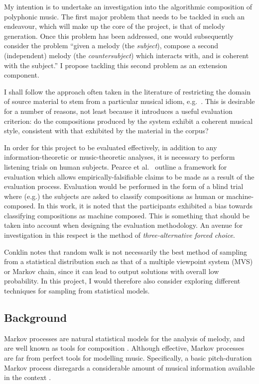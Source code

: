\documentclass[12pt,a4paper,twoside]{article}
\begin{document}
My intention is to undertake an investigation into the algorithmic composition
of polyphonic music. The first major problem that needs to be tackled in such an
endeavour, which will make up the core of the project, is that of melody
generation. Once this problem has been addressed, one would subsequently
consider the problem ``given a melody (the \emph{subject}), compose a second
(independent) melody (the \emph{countersubject}) which interacts with, and is
coherent with the subject.'' I propose tackling this second problem as an
extension component.

I shall follow the approach often taken in the literature of restricting the
domain of source material to stem from a particular musical idiom, e.g.\
\cite{pearce2001evaluation}. This is desirable for a number of reasons, not
least because it introduces a useful evaluation criterion: do the compositions
produced by the system exhibit a coherent musical style, consistent with that
exhibited by the material in the corpus?

In order for this project to be evaluated effectively, in addition to any
information-theoretic or music-theoretic analyses, it is necessary to perform
listening trials on human subjects. Pearce et al.\ \cite{pearce2001evaluation}
outline a framework for evaluation which allows empirically-falsifiable claims
to be made as a result of the evaluation process. Evaluation would be performed
in the form of a blind trial where (e.g.) the subjects are asked to classify
compositions as human or machine-composed. In this work, it is noted that the
participants exhibited a bias towards classifying compositions as machine
composed. This is something that should be taken into account when designing the
evaluation methodology. An avenue for investigation in this respect is the
method of \emph{three-alternative forced choice}.

Conklin \cite{conklin2003music} notes that random walk is not necessarily the
best method of sampling from a statistical distribution such as that of a
multiple viewpoint system (MVS) or Markov chain, since it can lead to output
solutions with overall low probability. In this project, I would therefore also
consider exploring different techniques for sampling from statistical models.
 
\subsection*{Background}

Markov processes are natural statistical models for the analysis of melody, and
are well known as tools for composition \cite{ames1989markov}. Although
effective, Markov processes are far from perfect tools for modelling music.
Specifically, a basic pitch-duration Markov process disregards a considerable
amount of musical information available in the context
\cite{conklin1995viewpoints}.  
\end{document}
